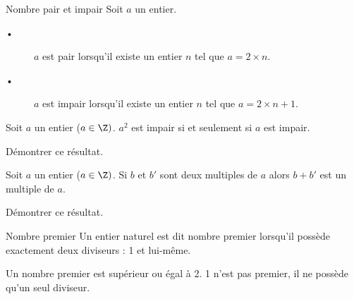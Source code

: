 \begin{DefT}{Nombre pair et impair}
Soit $a$ un entier. 
\begin{description}
\item[•] $a$ est pair lorsqu'il existe un entier $n$ tel que $a = 2\times n$.
\item[•]  $a$ est impair lorsqu'il existe un entier $n$ tel que $a = 2\times n +1$.
\end{description}
\end{DefT}


\begin{Th}
 
Soit $a$ un entier ($a \in \Z)$. $a^2$ est impair si et seulement si $a$ est impair.
\end{Th}


Démontrer ce résultat.

\begin{Th} 

Soit $a$ un entier ($a \in \Z)$. Si $b$ et $b'$ sont deux multiples de $a$ alors $b+b'$ est un multiple de $a$.
\end{Th}


Démontrer ce résultat.



\begin{DefT}{Nombre premier}
Un entier naturel est dit nombre premier lorsqu'il possède exactement deux diviseurs : 1 et lui-même.
\end{DefT}


\begin{Rq} 
Un nombre premier est supérieur ou égal à 2. 1 n'est pas premier, il ne possède qu'un seul diviseur.
\end{Rq}



